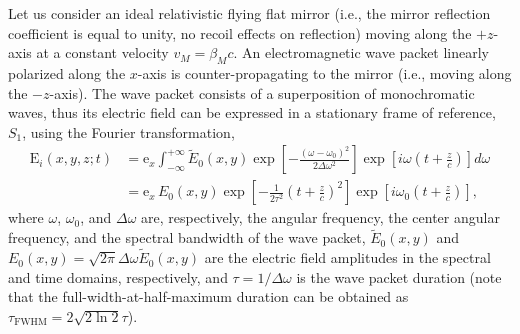 \documentclass[10pt, a4paper, twoside, openright]{report}
\renewcommand{\vec}[1]{\boldsymbol{\mathrm{#1}}}
\begin{document}
Let us consider an ideal relativistic flying flat mirror (i.e., the mirror reflection coefficient is equal to unity, no recoil effects on reflection) moving along the $ +z $-axis at a constant velocity $ v_M = \beta_M c $. An electromagnetic wave packet linearly polarized along the $ x $-axis is counter-propagating to the mirror (i.e., moving along the $ -z $-axis). The wave packet consists of a superposition of monochromatic waves, thus its electric field can be expressed in a stationary frame of reference, $ S_1 $, using the Fourier transformation,
\begin{equation}\label{eq:incident_lab_frame_1}
\begin{split}
\vec{E}_i \left(x, y, z; t \right) &= \vec{e}_x \int_{-\infty}^{+\infty} \tilde{E}_0 \left(x, y \right) \exp \left[ -\frac{\left( \omega - \omega_0 \right)^2}{2 \Delta \omega^2} \right] \exp \left[ i \omega \left(t + \frac{z}{c}\right) \right] d \omega \\
&= \vec{e}_x \, E_0 \left(x, y \right) \exp \left[ - \frac{1}{2 \tau^2} \left(t + \frac{z}{c}\right)^2 \right] \exp \left[ i \omega_0 \left(t + \frac{z}{c}\right) \right],
\end{split}
\end{equation}
where $ \omega $, $ \omega_0 $, and $ \Delta \omega $ are, respectively, the angular frequency, the center angular frequency, and the spectral bandwidth of the wave packet, $ \tilde{E}_0 \left(x, y \right) $ and $ E_0 \left(x, y \right) = \sqrt{2 \pi} \Delta \omega \tilde{E}_0 \left(x, y \right) $ are the electric field amplitudes in the spectral and time domains, respectively, and $ \tau = 1 / \Delta \omega $ is the wave packet duration (note that the full-width-at-half-maximum duration can be obtained as $ \tau_{\mathrm{FWHM}} = 2 \sqrt{2 \ln 2} \tau $).

\end{document}
